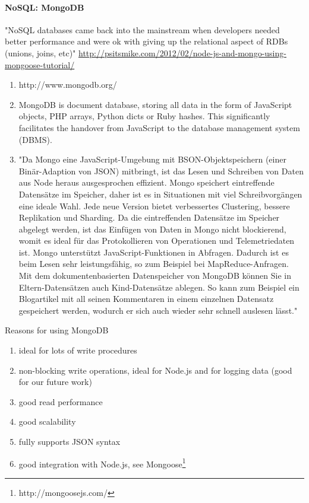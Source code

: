 \paragraph{NoSQL: MongoDB}

"NoSQL databases came back into the mainstream when developers needed better performance and were ok with giving up the relational aspect of RDBs (unions, joins, etc)" \url{http://psitsmike.com/2012/02/node-js-and-mongo-using-mongoose-tutorial/}

\begin{enumerate}
\item http://www.mongodb.org/
\item MongoDB is document database, storing all data in the form of JavaScript objects, PHP arrays, Python dicts or Ruby hashes. This significantly facilitates the handover from JavaScript to the database management system (DBMS).
\item "Da Mongo eine JavaScript-Umgebung mit BSON-Objektspeichern (einer Bin\"ar-Adaption von JSON) mitbringt, ist das Lesen und Schreiben von Daten aus Node heraus ausgesprochen effizient. Mongo speichert eintreffende Datens\"atze im Speicher, daher ist es in Situationen mit viel Schreibvorg\"angen eine ideale Wahl. Jede neue Version bietet verbessertes Clustering, bessere Replikation und Sharding. Da die eintreffenden Datens\"atze im Speicher abgelegt werden, ist das Einf\"ugen von Daten in Mongo nicht blockierend, womit es ideal f\"ur das Protokollieren von Operationen und Telemetriedaten ist. Mongo unterst\"utzt JavaScript-Funktionen in Abfragen. Dadurch ist es beim Lesen sehr leistungsf\"ahig, so zum Beispiel bei MapReduce-Anfragen. Mit dem dokumentenbasierten Datenspeicher von MongoDB k\"onnen Sie in Eltern-Datens\"atzen auch Kind-Datens\"atze ablegen. So kann zum Beispiel ein Blogartikel mit all seinen Kommentaren in einem einzelnen Datensatz gespeichert werden, wodurch er sich auch wieder sehr schnell auslesen l\"asst."  \cite{hughes2012einfuhrung}
\end{enumerate}

Reasons for using MongoDB
\begin{enumerate}
\item ideal for lots of write procedures
\item non-blocking write operations, ideal for Node.js and for logging data (good for our future work)
\item good read performance
\item good scalability
\item fully supports JSON syntax
\item good integration with Node.js, see Mongoose\footnote{http://mongoosejs.com/}
\end{enumerate}


